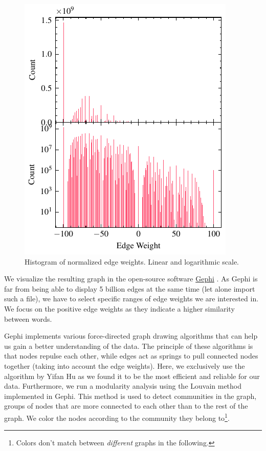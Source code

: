 \vspace{-1.2em}

\begin{figure}[H]
    \centering
    \includegraphics[width=0.9\linewidth]{assets/edge_weights-normalized.pdf}
    \caption{Histogram of normalized edge weights. Linear and logarithmic scale.}
    \label{fig:hist-norm}
\end{figure}

\vspace{-1.4em}

We visualize the resulting graph in the open-source software \href{https://gephi.org/}{Gephi} \cite{tools_gephi}. As Gephi is far from being able to display 5 billion edges at the same time (let alone import such a file), we have to select specific ranges of edge weights we are interested in. We focus on the positive edge weights as they indicate a higher similarity between words.

Gephi implements various force-directed graph drawing algorithms that can help us gain a better understanding of the data. The principle of these algorithms is that nodes repulse each other, while edges act as springs to pull connected nodes together (taking into account the edge weights). Here, we exclusively use the algorithm by Yifan Hu \cite{yifanhu} as we found it to be the most efficient and reliable for our data. Furthermore, we run a modularity analysis using the Louvain method \cite{louvain} implemented in Gephi. This method is used to detect communities in the graph, \ie groups of nodes that are more connected to each other than to the rest of the graph. We color the nodes according to the community they belong to\footnote{Colors don't match between \textit{different} graphs in the following.}.

